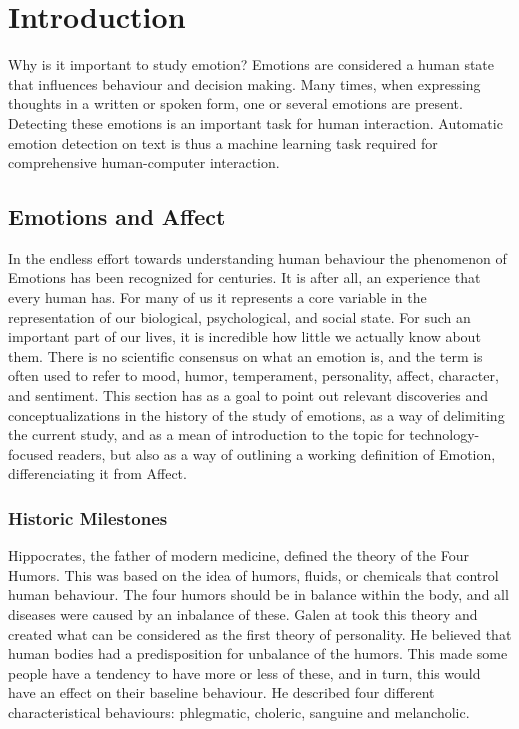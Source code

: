 \chapter{Introduction}\label{chap:Introduction}

Why is it important to study emotion?
Emotions are considered a human state that influences behaviour and decision making. Many times, when expressing thoughts in a written or spoken form, one or several emotions are present. Detecting these emotions is an important task for human interaction. Automatic emotion detection on text is thus a machine learning task required for comprehensive human-computer interaction.

\section{Emotions and Affect}\label{sec:Emotions and Affect}

In the endless effort towards understanding human behaviour the phenomenon of Emotions has been recognized for centuries. It is after all, an experience that every human has. For many of us it represents a core variable in the representation of our biological, psychological, and social state. For such an important part of our lives, it is incredible how little we actually know about them. There is no scientific consensus on what an emotion is, and the term is often used to refer to mood, humor, temperament, personality, affect, character, and sentiment.
This section has as a goal to point out relevant discoveries and conceptualizations in the history of the study of emotions, as a way of delimiting the current study, and as a mean of introduction to the topic for technology-focused readers, but also as a way of outlining a working definition of Emotion, differenciating it from Affect.

\subsection{Historic Milestones}\label{sub:Historic Milestones}

Hippocrates, the father of modern medicine, defined the theory of the Four Humors.
This was based on the idea of humors, fluids, or chemicals that control human behaviour.
The four humors should be in balance within the body, and all diseases were caused by an inbalance of these.\cite{kalachanis2015hippocratic}
Galen at took this theory and created what can be considered as the first theory of personality. He believed that human bodies had a predisposition for unbalance of the humors. This made some people have a tendency to have more or less of these, and in turn, this would have an effect on their baseline behaviour. He described four different characteristical behaviours: phlegmatic, choleric, sanguine and melancholic.\cite{irwin1947galen}

